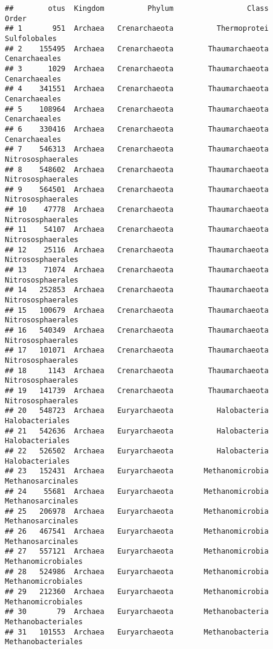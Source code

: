 \documentclass[
]{article}
\begin{document}
\begin{verbatim}
##        otus  Kingdom          Phylum                 Class               Order
## 1       951  Archaea   Crenarchaeota          Thermoprotei        Sulfolobales
## 2    155495  Archaea   Crenarchaeota        Thaumarchaeota       Cenarchaeales
## 3      1029  Archaea   Crenarchaeota        Thaumarchaeota       Cenarchaeales
## 4    341551  Archaea   Crenarchaeota        Thaumarchaeota       Cenarchaeales
## 5    108964  Archaea   Crenarchaeota        Thaumarchaeota       Cenarchaeales
## 6    330416  Archaea   Crenarchaeota        Thaumarchaeota       Cenarchaeales
## 7    546313  Archaea   Crenarchaeota        Thaumarchaeota   Nitrososphaerales
## 8    548602  Archaea   Crenarchaeota        Thaumarchaeota   Nitrososphaerales
## 9    564501  Archaea   Crenarchaeota        Thaumarchaeota   Nitrososphaerales
## 10    47778  Archaea   Crenarchaeota        Thaumarchaeota   Nitrososphaerales
## 11    54107  Archaea   Crenarchaeota        Thaumarchaeota   Nitrososphaerales
## 12    25116  Archaea   Crenarchaeota        Thaumarchaeota   Nitrososphaerales
## 13    71074  Archaea   Crenarchaeota        Thaumarchaeota   Nitrososphaerales
## 14   252853  Archaea   Crenarchaeota        Thaumarchaeota   Nitrososphaerales
## 15   100679  Archaea   Crenarchaeota        Thaumarchaeota   Nitrososphaerales
## 16   540349  Archaea   Crenarchaeota        Thaumarchaeota   Nitrososphaerales
## 17   101071  Archaea   Crenarchaeota        Thaumarchaeota   Nitrososphaerales
## 18     1143  Archaea   Crenarchaeota        Thaumarchaeota   Nitrososphaerales
## 19   141739  Archaea   Crenarchaeota        Thaumarchaeota   Nitrososphaerales
## 20   548723  Archaea   Euryarchaeota          Halobacteria     Halobacteriales
## 21   542636  Archaea   Euryarchaeota          Halobacteria     Halobacteriales
## 22   526502  Archaea   Euryarchaeota          Halobacteria     Halobacteriales
## 23   152431  Archaea   Euryarchaeota       Methanomicrobia   Methanosarcinales
## 24    55681  Archaea   Euryarchaeota       Methanomicrobia   Methanosarcinales
## 25   206978  Archaea   Euryarchaeota       Methanomicrobia   Methanosarcinales
## 26   467541  Archaea   Euryarchaeota       Methanomicrobia   Methanosarcinales
## 27   557121  Archaea   Euryarchaeota       Methanomicrobia  Methanomicrobiales
## 28   524986  Archaea   Euryarchaeota       Methanomicrobia  Methanomicrobiales
## 29   212360  Archaea   Euryarchaeota       Methanomicrobia  Methanomicrobiales
## 30       79  Archaea   Euryarchaeota       Methanobacteria  Methanobacteriales
## 31   101553  Archaea   Euryarchaeota       Methanobacteria  Methanobacteriales

\end{verbatim}
\end{document}
